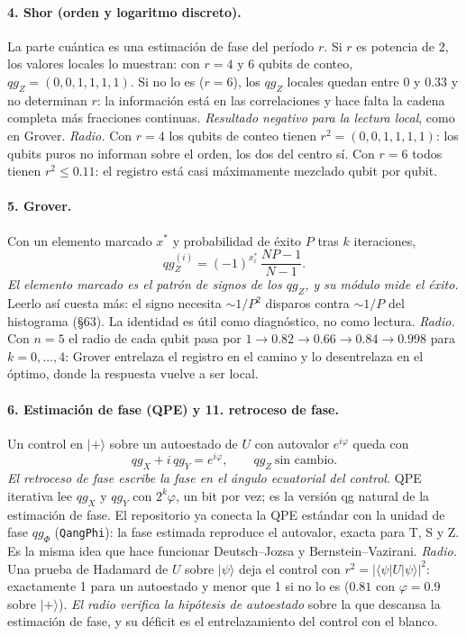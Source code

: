 \documentclass[11pt]{article}
\newcommand{\qZ}{qg_Z}
\newcommand{\qX}{qg_X}
\newcommand{\qY}{qg_Y}
\begin{document}
\paragraph{4. Shor (orden y logaritmo discreto).} La parte cuántica es una estimación de fase del período
$r$. Si $r$ es potencia de 2, los valores locales lo muestran: con $r=4$ y 6 qubits de conteo,
$\qZ=(0,0,1,1,1,1)$. Si no lo es ($r=6$), los $\qZ$ locales quedan entre 0 y 0.33 y no determinan $r$: la
información está en las correlaciones y hace falta la cadena completa más fracciones continuas.
\emph{Resultado negativo para la lectura local}, como en Grover. \emph{Radio.} Con $r=4$ los qubits de conteo tienen
$r^2=(0,0,1,1,1,1)$: los qubits puros no informan sobre el orden, los dos del centro sí. Con $r=6$ todos tienen
$r^2\le0.11$: el registro está casi máximamente mezclado qubit por qubit.

\paragraph{5. Grover.} Con un elemento marcado $x^\ast$ y probabilidad de éxito $P$ tras $k$ iteraciones,
\begin{equation}\label{eq:grover}
\qZ^{(i)}=(-1)^{x^\ast_i}\,\frac{NP-1}{N-1}.
\end{equation}
\emph{El elemento marcado es el patrón de signos de los $\qZ$, y su módulo mide el éxito.} Leerlo así
cuesta más: el signo necesita $\sim1/P^2$ disparos contra $\sim1/P$ del histograma (§63). La identidad es
útil como diagnóstico, no como lectura. \emph{Radio.} Con $n=5$ el radio de cada qubit pasa por
$1\to0.82\to0.66\to0.84\to0.998$ para $k=0,\dots,4$: Grover entrelaza el registro en el camino y lo desentrelaza en
el óptimo, donde la respuesta vuelve a ser local.

\paragraph{6. Estimación de fase (QPE) y 11. retroceso de fase.} Un control en $|+\rangle$ sobre un
autoestado de $U$ con autovalor $e^{i\varphi}$ queda con
\begin{equation}\label{eq:kick}
\qX+i\,\qY=e^{i\varphi},\qquad \qZ\ \text{sin cambio}.
\end{equation}
\emph{El retroceso de fase escribe la fase en el ángulo ecuatorial del control.} QPE iterativa lee
$\qX$ y $\qY$ con $2^k\varphi$, un bit por vez; es la versión qg natural de la estimación de fase. El
repositorio ya conecta la QPE estándar con la unidad de fase $qg_\Phi$ (\texttt{QangPhi}): la fase estimada
reproduce el autovalor, exacta para T, S y Z. Es la misma idea que hace funcionar Deutsch--Jozsa y
Bernstein--Vazirani. \emph{Radio.} Una prueba de Hadamard de $U$ sobre $|\psi\rangle$ deja el control con
$r^2=|\langle\psi|U|\psi\rangle|^2$: exactamente 1 para un autoestado y menor que 1 si no lo es ($0.81$ con
$\varphi=0.9$ sobre $|+\rangle$). \emph{El radio verifica la hipótesis de autoestado} sobre la que descansa la
estimación de fase, y su déficit es el entrelazamiento del control con el blanco.
\end{document}

